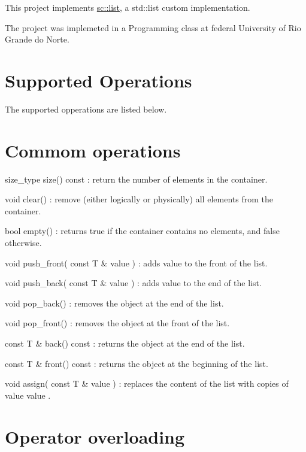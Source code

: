 This project implements {\ttfamily \mbox{\hyperlink{classsc_1_1list}{sc\+::list}}}, a {\ttfamily std\+::list} custom implementation.

The project was implemeted in a Programming class at federal University of Rio Grande do Norte.

\section*{Supported Operations}

The supported opperations are listed below.

\section*{Commom operations}


\begin{DoxyItemize}
\item {\ttfamily size\+\_\+type size() const} \+: return the number of elements in the container.
\item {\ttfamily void clear()} \+: remove (either logically or physically) all elements from the container.
\item {\ttfamily bool empty()} \+: returns true if the container contains no elements, and false otherwise.
\item {\ttfamily void push\+\_\+front( const T \& value )} \+: adds value to the front of the list.
\item {\ttfamily void push\+\_\+back( const T \& value )} \+: adds value to the end of the list.
\item {\ttfamily void pop\+\_\+back()} \+: removes the object at the end of the list.
\item {\ttfamily void pop\+\_\+front()} \+: removes the object at the front of the list.
\item {\ttfamily const T \& back() const} \+: returns the object at the end of the list.
\item {\ttfamily const T \& front() const} \+: returns the object at the beginning of the list.
\item {\ttfamily void assign( const T \& value )} \+: replaces the content of the list with copies of value {\ttfamily value} .
\end{DoxyItemize}

\section*{Operator overloading}



